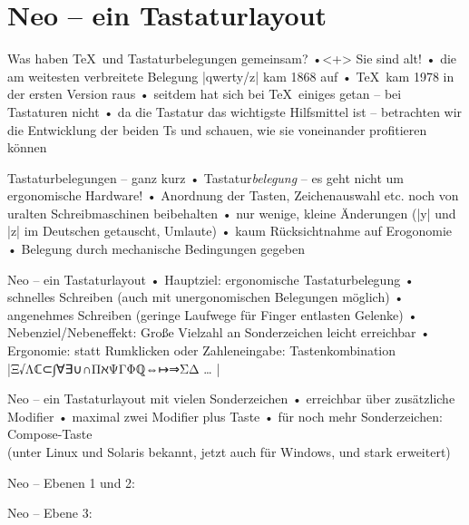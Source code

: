 \documentclass[t]{beamer}
\begin{document}
\section{Neo – ein Tastaturlayout}
\begin{frame}{Was haben \TeX\ und Tastaturbelegungen gemeinsam?}
•<+> Sie sind alt!
• die am weitesten verbreitete Belegung |qwerty/z| kam 1868 auf
• \TeX\ kam 1978 in der ersten Version raus
• seitdem hat sich bei \TeX\ einiges getan – bei Tastaturen nicht
• da die Tastatur das wichtigste Hilfsmittel ist – betrachten wir die Entwicklung der beiden Ts und schauen, wie sie voneinander profitieren können
\•
\end{frame}

\begin{frame}{Tastaturbelegungen – ganz kurz}
• Tastatur\emph{belegung} – es geht nicht um ergonomische Hardware!
• Anordnung der Tasten, Zeichenauswahl etc. noch von uralten Schreibmaschinen beibehalten
• nur wenige, kleine Änderungen (|y| und |z| im Deutschen getauscht, Umlaute)
• kaum Rücksichtnahme auf Erogonomie
• Belegung durch mechanische Bedingungen gegeben
\•
\end{frame}

\begin{frame}[fragile]{Neo – ein Tastaturlayout}
• Hauptziel: ergonomische Tastaturbelegung
• schnelles Schreiben (auch mit unergonomischen Belegungen möglich)
• angenehmes Schreiben (geringe Laufwege für Finger entlasten Gelenke)\pause
• Nebenziel/Nebeneffekt: Große Vielzahl an Sonderzeichen leicht erreichbar
• Ergonomie: statt Rumklicken oder Zahleneingabe: Tastenkombination\\%
|Ξ√Λℂ⊂∫∀∃∪∩ΠℵΨΓΦℚ⇔↦⇒ΣΔ … |
\•
\end{frame}

\begin{frame}[fragile]{Neo – ein Tastaturlayout mit vielen Sonderzeichen}
• erreichbar über zusätzliche Modifier
• maximal zwei Modifier plus Taste
• für noch mehr Sonderzeichen: Compose-Taste\\%
(unter Linux und Solaris bekannt, jetzt auch für Windows, und stark erweitert)
\•
\end{frame}

\begin{frame}{Neo – Ebenen 1 und 2:}

\end{frame}

\begin{frame}{Neo – Ebene 3:}

\end{frame} 
\end{document}

